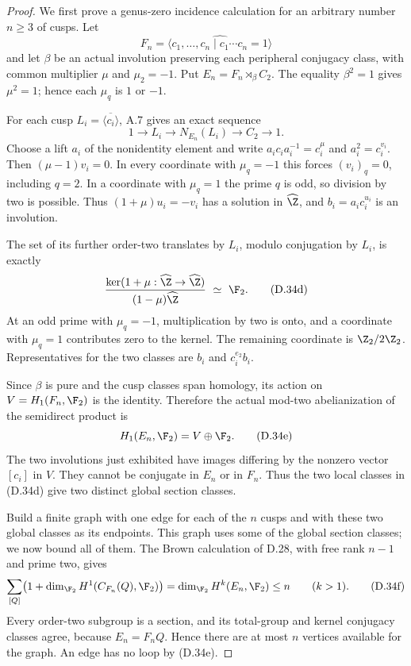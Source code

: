\begin{proof}
We first prove a genus-zero incidence calculation for an
arbitrary number $n\geq3$ of cusps.  Let
\[
 F_n=\widehat{\langle c_1,\ldots,c_n\mid
                              c_1\cdots c_n=1\rangle}
\]
and let $\beta$ be an actual involution preserving each
peripheral conjugacy class, with common multiplier $\mu$
and $\mu_2=-1$.  Put $E_n=F_n\rtimes_\beta C_2$.
The equality $\beta^2=1$ gives $\mu^2=1$; hence each
$\mu_q$ is $1$ or $-1$.

For each cusp $L_i=\overline{\langle c_i\rangle}$,
A.7 gives an exact sequence
\[
 1\longrightarrow L_i\longrightarrow N_{E_n}(L_i)
                          \longrightarrow C_2\longrightarrow1.
                                                        \tag{D.34c}
\]
Choose a lift $a_i$ of the nonidentity element and write
$a_i c_i a_i^{-1}=c_i^\mu$ and $a_i^2=c_i^{v_i}$.
Then $(\mu-1)v_i=0$.  In every coordinate with
$\mu_q=-1$ this forces $(v_i)_q=0$, including $q=2$.
In a coordinate with $\mu_q=1$ the prime $q$ is odd,
so division by two is possible.  Thus
$(1+\mu)u_i=-v_i$ has a solution in $\widehat\Z$,
and $b_i=a_i c_i^{u_i}$ is an involution.

The set of its further order-two translates by $L_i$,
modulo conjugation by $L_i$, is exactly
\[
 \frac{\ker(1+\mu:\widehat\Z\to\widehat\Z)}
      {(1-\mu)\widehat\Z}\ \simeq\ \F_2.               \tag{D.34d}
\]
At an odd prime with $\mu_q=-1$, multiplication by two
is onto, and a coordinate with $\mu_q=1$ contributes
zero to the kernel.  The remaining coordinate is
$\Z_2/2\Z_2$.  Representatives for the two classes are
$b_i$ and $c_i^{e_2}b_i$.

Since $\beta$ is pure and the cusp classes span homology,
its action on $V=H_1(F_n,\F_2)$ is the identity.  Therefore
the actual mod-two abelianization of the semidirect product is
\[
                  H_1(E_n,\F_2)=V\oplus\F_2.             \tag{D.34e}
\]
The two involutions just exhibited have images differing by
the nonzero vector $[c_i]$ in $V$.  They cannot be conjugate
in $E_n$ or in $F_n$.  Thus the two local classes in
(D.34d) give two distinct global section classes.

Build a finite graph with one edge for each of the $n$
cusps and with these two global classes as its endpoints.
This graph uses some of the global section classes; we
now bound all of them.  The Brown calculation of D.28,
with free rank $n-1$ and prime two, gives
\[
 \sum_{[Q]}
   \bigl(1+\dim_{\F_2}H^1(C_{F_n}(Q),\F_2)\bigr)
       =\dim_{\F_2}H^k(E_n,\F_2)\leq n\qquad(k>1).
                                                        \tag{D.34f}
\]
Every order-two subgroup is a section, and its total-group
and kernel conjugacy classes agree, because $E_n=F_nQ$.
Hence there are at most $n$ vertices available for the graph.
An edge has no loop by (D.34e).


\end{proof}
